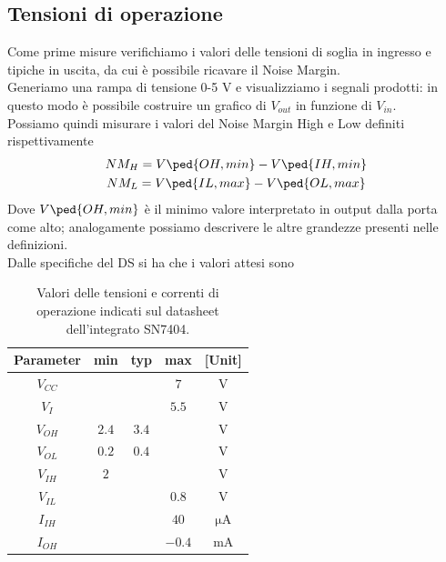 \documentclass[10pt, a4paper, italian]{article}
\begin{document}
\subsection{Tensioni di operazione}
Come prime misure verifichiamo i valori delle tensioni di soglia in ingresso e tipiche in uscita, da cui è possibile ricavare il Noise Margin.\\
Generiamo una rampa di tensione 0-5 V e visualizziamo i segnali prodotti:
in questo modo è possibile costruire un grafico di $V_{out}$ in funzione di $V_{in}$.\\ %
Possiamo quindi misurare i valori del Noise Margin High e Low definiti rispettivamente
\begin{gather*}
    NM_H = V\ped{OH, min} - V\ped{IH, min}\\
    NM_L = V\ped{IL,max} - V\ped{OL, max}
\end{gather*}
Dove $V\ped{OH, min}$ è il minimo valore interpretato in output dalla porta come alto; analogamente possiamo descrivere le altre grandezze presenti nelle definizioni.\\
Dalle specifiche del DS si ha che i valori attesi sono %
\begin{table}[htb]
\centering
\begin{tabular}{cccc|c}
\toprule
Parameter  & min & typ & max & [Unit] \\
\midrule
\midrule
$V_{CC}$ &  &  & $7$ & V \\
$V_I$	 &  &  & $5.5$ & V\\
$V_{OH}$ & $2.4$  & $3.4$ & & V \\
$V_{OL}$ & $0.2$  & $0.4$ & & V \\
$V_{IH}$ & $2$  &  & & V  \\
$V_{IL}$ &  &  & $0.8$ & V \\
$I_{IH}$ &  &  & $40$ & $\si{\micro\A}$ \\
$I_{OH}$ &  &  & $-0.4$ & mA \\
\bottomrule 
\end{tabular}

\caption{Valori delle tensioni e correnti di operazione indicati sul
datasheet dell'integrato SN7404.}
\label{tab: notDS}
\end{table}
\end{document}

